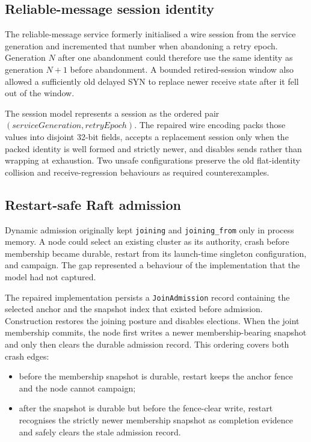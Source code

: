 \subsection{Reliable-message session identity}

The reliable-message service formerly initialised a wire session from the
service generation and incremented that number when abandoning a retry epoch.
Generation $N$ after one abandonment could therefore use the same identity as
generation $N+1$ before abandonment. A bounded retired-session window also
allowed a sufficiently old delayed SYN to replace newer receive state after it
fell out of the window.

The session model represents a session as the ordered pair
$(\mathit{serviceGeneration},\mathit{retryEpoch})$. The repaired wire encoding
packs those values into disjoint 32-bit fields, accepts a replacement session
only when the packed identity is well formed and strictly newer, and disables
sends rather than wrapping at exhaustion. Two unsafe configurations preserve the
old flat-identity collision and receive-regression behaviours as required
counterexamples.

\subsection{Restart-safe Raft admission}

Dynamic admission originally kept \texttt{joining} and
\texttt{joining\_from} only in process memory. A node could select an existing
cluster as its authority, crash before membership became durable, restart from
its launch-time singleton configuration, and campaign. The gap represented
a behaviour of the implementation that the model had not captured.

The repaired implementation persists a \texttt{JoinAdmission} record
containing the selected anchor and the snapshot index that existed before
admission. Construction restores the joining posture and disables elections.
When the joint membership commits, the node first writes a newer
membership-bearing snapshot and only then clears the durable admission record.
This ordering covers both crash edges:

\begin{itemize}
    \item before the membership snapshot is durable, restart keeps the
        anchor fence and the node cannot campaign;
    \item after the snapshot is durable but before the fence-clear write,
        restart recognises the strictly newer membership snapshot as completion
        evidence and safely clears the stale admission record.
\end{itemize}

